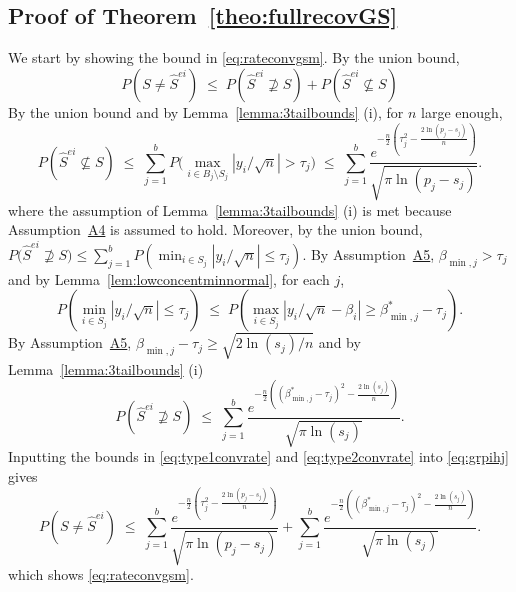 \documentclass[
  12pt]{article}
\begin{document}
\subsection{Proof of Theorem~\ref{theo:fullrecovGS}} We start by showing the bound in \eqref{eq:rateconvgsm}. By the union bound,
\begin{equation}\label{eq:grpihj}
    P(S\neq \hat{S}^{ei}) \; \leq\; P(\hat{S}^{ei}\not\supseteq S)+P(\hat{S}^{ei}\not\subseteq S)
\end{equation}
By the union bound and by Lemma~\ref{lemma:3tailbounds} (i), for $n$ large enough,
\begin{equation}\label{eq:type1convrate2}
P\left(\hat{S}^{ei} \not\subseteq S\right)\;\leq\; \sum_{j=1}^b P\Big(\max_{i\in B_j\setminus S_j}|y_i/\sqrt{n}|>\tau_{j}\Big)\;\leq\;\sum_{j=1}^b\frac{e^{-\tfrac{n}{2}\left(\tau_j^2-\tfrac{2\ln(p_j-s_j)}{n}\right)}}{\sqrt{\pi\ln(p_j-s_j)}} 	.
 \end{equation}
where the assumption of Lemma~\ref{lemma:3tailbounds} (i) is met because Assumption~\hyperlink{lab:A4}{A4} is assumed to hold. Moreover, by the union bound, 
	$P\big(\hat{S}^{ei} \not\supseteq S\big)\leq \sum_{j=1}^b  P\left(\min_{i\in S_j}|y_i/\sqrt{n}|\leq\tau_j\right)$. 
	By Assumption~\hyperlink{lab:A5}{A5}, $\beta_{\min,j}>\tau_j$ and by Lemma~\ref{lem:lowconcentminnormal}, for each $j$,	
	$$P\left(\min_{i\in S_j}|y_i/\sqrt{n}|\leq\tau_j\right)\;\leq\; P\left(\max_{i\in S_j}|y_i/\sqrt{n}-\beta_i| \geq\beta_{\min,j}^*-\tau_j \right).$$ By Assumption~\hyperlink{lab:A5}{A5}, $\beta_{\min,j}-\tau_j\geq \sqrt{2\ln(s_j)/n}$ and by Lemma~\ref{lemma:3tailbounds} (i)
	\begin{equation}\label{eq:type2convrate2}
P\left(\hat{S}^{ei}\not\supseteq S \right) \;\leq\;\sum_{j=1}^b\frac{e^{-\tfrac{n}{2}\left((\beta^*_{\min,j}-\tau_j)^2-\tfrac{2\ln(s_j)}{n}\right)}}{\sqrt{\pi\ln(s_j)}}.
\end{equation}
Inputting the bounds in \eqref{eq:type1convrate} and \eqref{eq:type2convrate} into \eqref{eq:grpihj} gives
\begin{equation}\label{eq:fhfhfhf}
P(S\neq \hat{S}^{ei}) \; \leq\;\sum_{j=1}^b\frac{e^{-\tfrac{n}{2}\left(\tau_j^2-\tfrac{2\ln(p_j-s_j)}{n}\right)}}{\sqrt{\pi\ln(p_j-s_j)}}+\sum_{j=1}^b\frac{e^{-\tfrac{n}{2}\left((\beta^*_{\min,j}-\tau_j)^2-\tfrac{2\ln(s_j)}{n}\right)}}{\sqrt{\pi\ln(s_j)}}.
\end{equation}
which shows \eqref{eq:rateconvgsm}.
\end{document}
